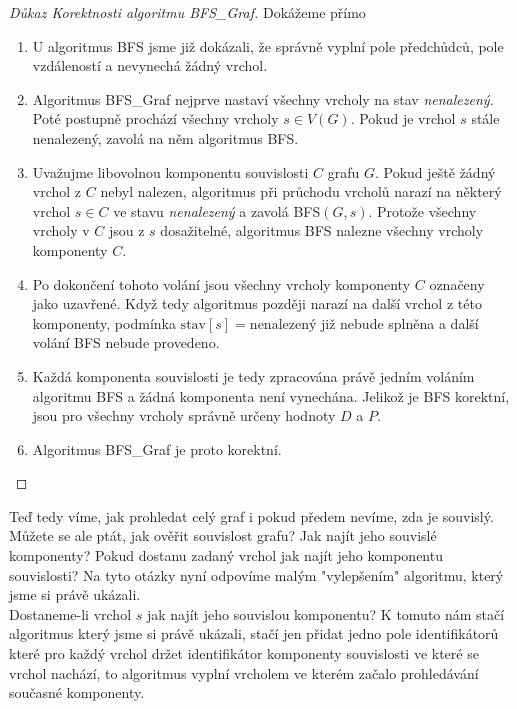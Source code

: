 \begin{proof}[Důkaz Korektnosti algoritmu BFS\_Graf]
    Dokážeme přímo
    \begin{enumerate}
        \item U algoritmus BFS jsme již dokázali, že správně vyplní pole předchůdců, pole vzdáleností a nevynechá žádný vrchol.
        
        \item Algoritmus BFS\_Graf nejprve nastaví všechny vrcholy na stav \textit{nenalezený}. Poté postupně prochází všechny vrcholy $s \in V(G)$. Pokud je vrchol $s$ stále nenalezený, zavolá na něm algoritmus BFS.

        \item Uvažujme libovolnou komponentu souvislosti $C$ grafu $G$. Pokud ještě žádný vrchol z $C$ nebyl nalezen, algoritmus při průchodu vrcholů narazí na některý vrchol $s \in C$ ve stavu \textit{nenalezený} a zavolá BFS$(G,s)$. Protože všechny vrcholy v $C$ jsou z $s$ dosažitelné, algoritmus BFS nalezne všechny vrcholy komponenty $C$.
        
        \item Po dokončení tohoto volání jsou všechny vrcholy komponenty $C$ označeny jako uzavřené. Když tedy algoritmus později narazí na další vrchol z této komponenty, podmínka $\text{stav}[s] = \text{nenalezený}$ již nebude splněna a další volání BFS nebude provedeno.
        
        \item Každá komponenta souvislosti je tedy zpracována právě jedním voláním algoritmu BFS a žádná komponenta není vynechána. Jelikož je BFS korektní, jsou pro všechny vrcholy správně určeny hodnoty $D$ a $P$.

        \item Algoritmus BFS\_Graf je proto korektní.
    \end{enumerate}
\end{proof}

\noindent Teď tedy víme, jak prohledat celý graf i pokud předem nevíme, zda je souvislý. Můžete se ale ptát, jak ověřit souvislost grafu? Jak najít jeho souvislé komponenty? Pokud dostanu zadaný vrchol jak najít jeho komponentu souvislosti? Na tyto otázky nyní odpovíme malým "vylepšením" algoritmu, který jsme si právě ukázali. \\

\noindent Dostaneme-li vrchol $s$ jak najít jeho souvislou komponentu? K tomuto nám stačí algoritmus který jsme si právě ukázali, stačí jen přidat jedno pole identifikátorů které pro každý vrchol držet identifikátor komponenty souvislosti ve které se vrchol nachází, to algoritmus vyplní vrcholem ve kterém začalo prohledávání současné komponenty.

